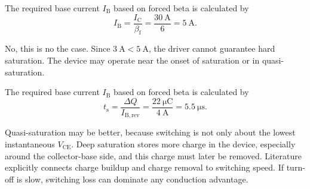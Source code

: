 
\begin{solutionblock}
    The required base current $I_\mathrm{B}$ based on forced beta is calculated by
    \begin{equation*}
        I_\mathrm{B} = \frac{I_\mathrm{C}}{\beta_\mathrm{f}} = \frac{\SI{30}{\ampere}}{6} = \SI{5}{\ampere}.
    \end{equation*}
\end{solutionblock} 


\begin{solutionblock}
    No, this is no the case. Since $\SI{3}{\ampere} < \SI{5}{\ampere}$, the driver cannot guarantee hard saturation. 
    The device may operate near the onset of saturation or in quasi-saturation.
\end{solutionblock} 


\begin{solutionblock}
    The required base current $I_\mathrm{B}$ based on forced beta is calculated by
    \begin{equation}
        t_\mathrm{s} = \frac{\Delta Q}{I_{\mathrm{B},\mathrm{rev}}} 
        = \frac{\SI{22}{\micro\coulomb}}{\SI{4}{\ampere}} = \SI{5.5}{\micro\second}.
    \end{equation}
\end{solutionblock} 


\begin{solutionblock}
    Quasi-saturation may be better, because switching is not only about the lowest instantaneous $V_\mathrm{CE}$. 
    Deep saturation stores more charge in the device, especially around the collector-base side, and this charge must later be removed. 
    Literature explicitly connects charge buildup and charge removal to switching speed. If turn-off is slow, switching loss can dominate any conduction advantage.
\end{solutionblock} 

